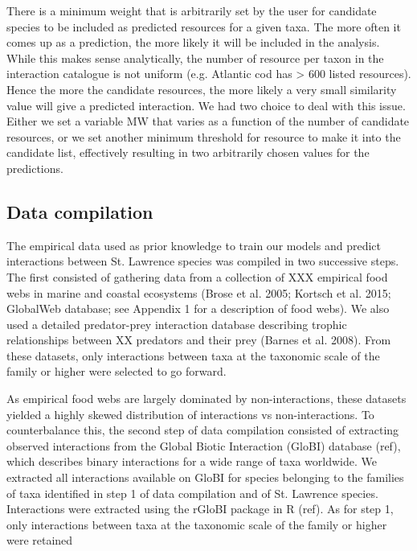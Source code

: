 \documentclass[letterpaper]{article}
\begin{document}
There is a minimum weight that is arbitrarily set by the user for candidate species to be included as predicted resources for a given taxa. The more often it comes up as a prediction, the more likely it will be included in the analysis. While this makes sense analytically, the number of resource per taxon in the interaction catalogue is not uniform (e.g. Atlantic cod has > 600 listed resources). Hence the more the candidate resources, the more likely a very small similarity value will give a predicted interaction. We had two choice to deal with this issue. Either we set a variable MW that varies as a function of the number of candidate resources, or we set another minimum threshold for resource to make it into the candidate list, effectively resulting in two arbitrarily chosen values for the predictions.

  \subsection{Data compilation}


The empirical data used as prior knowledge to train our models and predict interactions between St. Lawrence species was compiled in two successive steps. The first consisted of gathering data from a collection of XXX empirical food webs in marine and coastal ecosystems (Brose et al. 2005; Kortsch et al. 2015; GlobalWeb database; see Appendix 1 for a description of food webs). We also used a detailed predator-prey interaction database describing trophic relationships between XX predators and their prey (Barnes et al. 2008). From these datasets, only interactions between taxa at the taxonomic scale of the family or higher were selected to go forward.

As empirical food webs are largely dominated by non-interactions, these datasets yielded a highly skewed distribution of interactions vs non-interactions. To counterbalance this, the second step of data compilation consisted of extracting observed interactions from the Global Biotic Interaction (GloBI) database (ref), which describes binary interactions for a wide range of taxa worldwide. We extracted all interactions available on GloBI for species belonging to the families of taxa identified in step 1 of data compilation and of St. Lawrence species. Interactions were extracted using the rGloBI package in R (ref). As for step 1, only interactions between taxa at the taxonomic scale of the family or higher were retained
\end{document}
